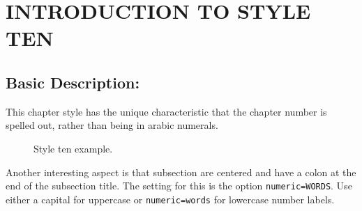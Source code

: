 \documentclass{book}
\begin{document}
\chapter{INTRODUCTION TO STYLE TEN}
\makeatletter


\makeatother
\section{Basic Description:}
This chapter style has the unique characteristic that the chapter number is spelled out, rather than being in arabic numerals. 


\begin{figure}[ht]
\centering
{}
\caption{Style ten example.}
\end{figure}

Another interesting aspect is that subsection are centered and have a colon at the end of the subsection title. The setting for this is the option \lstinline{numeric=WORDS}. Use either a capital for uppercase or \lstinline{numeric=words} for lowercase number labels.
\end{document}
